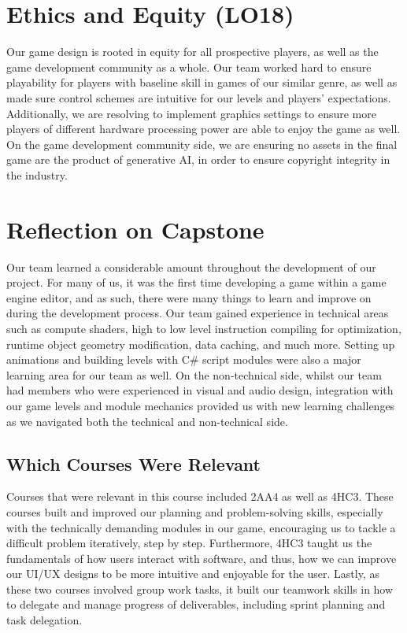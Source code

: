 \documentclass{article}
\begin{document}
\section{Ethics and Equity (LO18)}

Our game design is rooted in equity for all prospective players, as well as the 
game development community as a whole. Our team worked hard to ensure playability 
for players with baseline skill in games of our similar genre, as well as made 
sure control schemes are intuitive for our levels and players' expectations. 
Additionally, we are resolving to implement graphics settings to ensure more 
players of different hardware processing power are able to enjoy the game as 
well. On the game development community side, we are ensuring no assets in the 
final game are the product of generative AI, in order to ensure copyright 
integrity in the industry.

\section{Reflection on Capstone}

Our team learned a considerable amount throughout the development of our project. 
For many of us, it was the first time developing a game within a game engine editor, 
and as such, there were many things to learn and improve on during the development 
process. Our team gained experience in technical areas such as compute shaders, 
high to low level instruction compiling for optimization, runtime object geometry 
modification, data caching, and much more. Setting up animations and building levels 
with C\# script modules were also a major learning area for our team as well. On the 
non-technical side, whilst our team had members who were experienced in visual and 
audio design, integration with our game levels and module mechanics provided us 
with new learning challenges as we navigated both the technical and non-technical side.

\subsection{Which Courses Were Relevant}

Courses that were relevant in this course included 2AA4 as well as 4HC3. These 
courses built and improved our planning and problem-solving skills, especially 
with the technically demanding modules in our game, encouraging us to tackle a 
difficult problem iteratively, step by step. Furthermore, 4HC3 taught us the 
fundamentals of how users interact with software, and thus, how we can improve our 
UI/UX designs to be more intuitive and enjoyable for the user. Lastly, as 
these two courses involved group work tasks, it built our teamwork skills in how 
to delegate and manage progress of deliverables, including sprint planning and task 
delegation.
\end{document}
